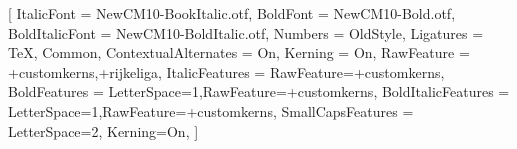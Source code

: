 \setmainfont{NewCM10-Book.otf}[
  ItalicFont = NewCM10-BookItalic.otf,
  BoldFont = NewCM10-Bold.otf,
  BoldItalicFont = NewCM10-BoldItalic.otf,
  Numbers = OldStyle,
  Ligatures = {TeX, Common},
  ContextualAlternates = On,
  Kerning = On,
  RawFeature = {+customkerns,+rijkeliga},
  ItalicFeatures = {RawFeature={+customkerns}},
  BoldFeatures = {LetterSpace=1,RawFeature={+customkerns}},
  BoldItalicFeatures = {LetterSpace=1,RawFeature={+customkerns}},
  SmallCapsFeatures = {LetterSpace=2, Kerning=On},
]
\linespread{1.08}

\newcommand{\VersionFontName}{New Computer Modern Book}






